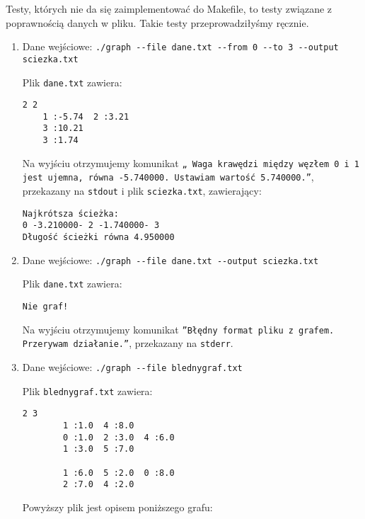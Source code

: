 \documentclass[]{article}
\begin{document}
Testy, których nie da się zaimplementować do Makefile, to testy związane z poprawnością danych w pliku. Takie testy przeprowadziłyśmy ręcznie.

\begin{enumerate}
    \item Dane wejściowe: \texttt{./graph -{}-file dane.txt -{}-from 0 -{}-to 3 -{}-output sciezka.txt}
    
Plik \texttt{dane.txt} zawiera:
\begin{verbatim}
2 2
    1 :-5.74  2 :3.21
    3 :10.21
    3 :1.74
\end{verbatim}
Na wyjściu otrzymujemy komunikat \texttt{„ Waga krawędzi między węzłem 0 i 1 jest ujemna, równa -5.740000. Ustawiam wartość 5.740000.”}, przekazany na \texttt{stdout} i plik \texttt{sciezka.txt}, zawierający:
\begin{verbatim}
Najkrótsza ścieżka: 
0 -3.210000- 2 -1.740000- 3
Długość ścieżki równa 4.950000
\end{verbatim}
    \item Dane wejściowe: \texttt{./graph -{}-file dane.txt -{}-output sciezka.txt}

Plik \texttt{dane.txt} zawiera:
\begin{verbatim}
Nie graf!
\end{verbatim}
Na wyjściu otrzymujemy komunikat \texttt{”Błędny format pliku z grafem. Przerywam działanie.”}, przekazany na \texttt{stderr}.

    \item Dane wejściowe: \texttt{./graph -{}-file blednygraf.txt}
    
Plik \texttt{blednygraf.txt} zawiera:
\begin{verbatim}
2 3
        1 :1.0  4 :8.0
        0 :1.0  2 :3.0  4 :6.0
        1 :3.0  5 :7.0

        1 :6.0  5 :2.0  0 :8.0
        2 :7.0  4 :2.0
\end{verbatim}
Powyższy plik jest opisem poniższego grafu:
\begin{figure}
\centering
\end{figure}
\end{enumerate}
\end{document}
